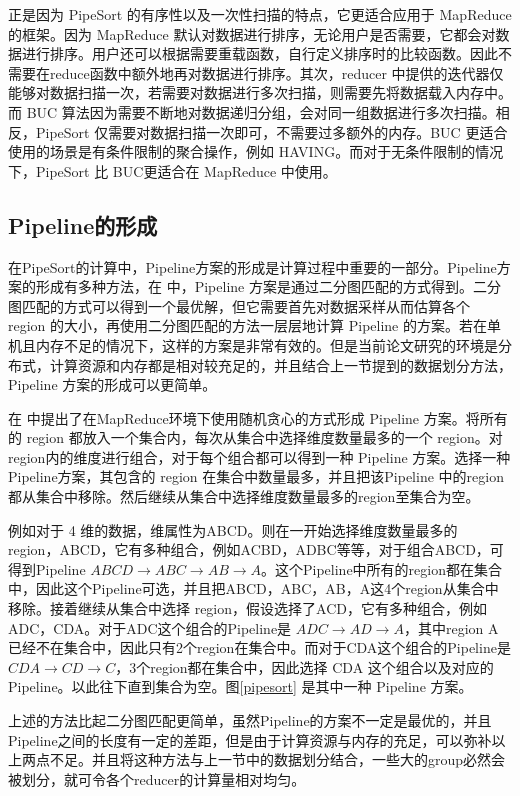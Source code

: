 正是因为 PipeSort 的有序性以及一次性扫描的特点，它更适合应用于 MapReduce 的框架。因为 MapReduce 默认对数据进行排序，无论用户是否需要，它都会对数据进行排序。用户还可以根据需要重载函数，自行定义排序时的比较函数。因此不需要在reduce函数中额外地再对数据进行排序。其次，reducer 中提供的迭代器仅能够对数据扫描一次，若需要对数据进行多次扫描，则需要先将数据载入内存中。而 BUC 算法因为需要不断地对数据递归分组，会对同一组数据进行多次扫描。相反，PipeSort 仅需要对数据扫描一次即可，不需要过多额外的内存。BUC 更适合使用的场景是有条件限制的聚合操作，例如 HAVING。而对于无条件限制的情况下，PipeSort 比 BUC更适合在 MapReduce 中使用。


\subsection{Pipeline的形成}

在PipeSort的计算中，Pipeline方案的形成是计算过程中重要的一部分。Pipeline方案的形成有多种方法，在 \cite{agarwal1996computation} 中，Pipeline 方案是通过二分图匹配的方式得到。二分图匹配的方式可以得到一个最优解，但它需要首先对数据采样从而估算各个 region 的大小，再使用二分图匹配的方法一层层地计算 Pipeline 的方案。若在单机且内存不足的情况下，这样的方案是非常有效的。但是当前论文研究的环境是分布式，计算资源和内存都是相对较充足的，并且结合上一节提到的数据划分方法，Pipeline 方案的形成可以更简单。

在\cite{wang2013scalable} 中提出了在MapReduce环境下使用随机贪心的方式形成 Pipeline 方案。将所有的 region 都放入一个集合内，每次从集合中选择维度数量最多的一个 region。对region内的维度进行组合，对于每个组合都可以得到一种 Pipeline 方案。选择一种Pipeline方案，其包含的 region 在集合中数量最多，并且把该Pipeline 中的region都从集合中移除。然后继续从集合中选择维度数量最多的region至集合为空。

例如对于 4 维的数据，维属性为ABCD。则在一开始选择维度数量最多的 region，ABCD，它有多种组合，例如ACBD，ADBC等等，对于组合ABCD，可得到Pipeline $ABCD\rightarrow ABC\rightarrow AB\rightarrow A$。这个Pipeline中所有的region都在集合中，因此这个Pipeline可选，并且把ABCD，ABC，AB，A这4个region从集合中移除。接着继续从集合中选择 region，假设选择了ACD，它有多种组合，例如ADC，CDA。对于ADC这个组合的Pipeline是  $ADC\rightarrow AD\rightarrow A$，其中region A已经不在集合中，因此只有2个region在集合中。而对于CDA这个组合的Pipeline是  $CDA\rightarrow CD\rightarrow C$，3个region都在集合中，因此选择 CDA 这个组合以及对应的Pipeline。以此往下直到集合为空。图\ref{pipesort} 是其中一种 Pipeline 方案。

上述的方法比起二分图匹配更简单，虽然Pipeline的方案不一定是最优的，并且Pipeline之间的长度有一定的差距，但是由于计算资源与内存的充足，可以弥补以上两点不足。并且将这种方法与上一节中的数据划分结合，一些大的group必然会被划分，就可令各个reducer的计算量相对均匀。

